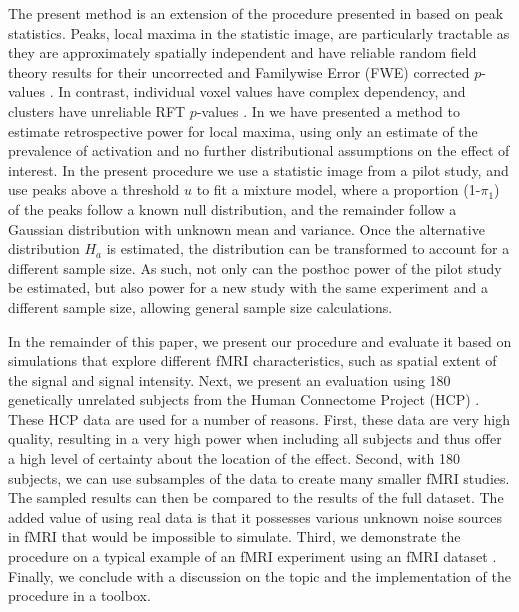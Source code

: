 The present method is an extension of the procedure presented in \citet{Durnez2014} based on peak statistics.  Peaks, local maxima in the statistic image, are particularly tractable as they are approximately spatially independent and have reliable random field theory results for their  uncorrected and Familywise Error (FWE) corrected $p$-values \citep{Durnez2014}. In contrast, individual voxel values have complex dependency, and clusters have unreliable RFT $p$-values \citep{Woo2014,Hayasaka2003,Durnez2014,Silver2011,Eklund2016}.  In \citet{Durnez2014} we have presented a method to estimate retrospective power for local maxima, using only an estimate of the prevalence of activation and no further distributional assumptions on the effect of interest.  In the present procedure we use a statistic image from a pilot study, and use peaks above a threshold $u$ to fit a mixture model, where a proportion (1-$\pi_1$) of the peaks follow a known null distribution, and the remainder follow a Gaussian distribution with unknown mean and variance. Once the alternative distribution $H_a$ is estimated, the distribution can be transformed to account for a different sample size.  As such, not only can the posthoc power of the pilot study  be estimated, but also power for a new study with the same experiment and a different sample size, allowing general sample size calculations.

In the remainder of this paper, we present our procedure and evaluate it based on simulations that explore different fMRI characteristics, such as spatial extent of the signal and signal intensity.  Next, we present an evaluation using 180 genetically unrelated subjects from the Human Connectome Project (HCP) \citep{VanEssen2012}.  These HCP data are used for a number of reasons. First, these data are very high quality, resulting in a very high power when including all subjects and thus offer a high level of certainty about the location of the effect. Second, with 180 subjects, we can use subsamples of the data to create many smaller fMRI studies.  The sampled results can then be compared to the results of the full dataset.  The added value of using real data is that it possesses various unknown noise sources in fMRI that would be impossible to simulate.  Third, we demonstrate the procedure on a typical example of an fMRI experiment using an fMRI dataset \citep{Seurinck2011}.  Finally, we conclude with a discussion on the topic and the implementation of the procedure in a toolbox.
